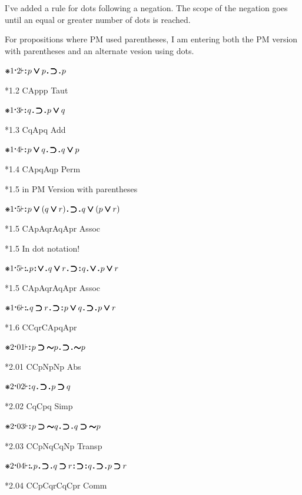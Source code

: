 \documentclass[12pt]{article}
\newcommand{\pmthm}{\mathpunct{\text{\scalebox{.5}[1]{$\boldsymbol\vdash$}}}} %
\newcommand{\pmast}{\text{\resizebox{!}{.75\height}{\ding{107}}}} %
\newcommand{\pmcdot}{\text{\raisebox{.05cm}{$\boldsymbol\cdot$}}} %
\newcommand{\pmiddf}{\mathbin{=}}
\newcommand{\pmd}{\hbox{\rule{.3ex}{.3ex}}} %
\newcommand{\pmdd}{\overset{\pmd}{\pmd}} %
\newcommand{\pmdot}{\mathinner{\pmd}}
\newcommand{\pmdott}{\mathinner{\pmdd}}
\newcommand{\pmdottt}{\mathinner{\pmdd\hspace{1pt}\pmd}}
\newcommand{\pmnot}{\mathord{\ooalign{$\boldsymbol{\sim}\mkern.5mu$\hidewidth\cr$\boldsymbol{\sim}$\cr\hidewidth$\mkern.5mu\boldsymbol{\sim}$}}}
\newcommand{\pmor}{\mathbin{\ooalign{$\boldsymbol{\vee}\mkern.5mu$\hidewidth\cr$\boldsymbol{\vee}$\cr\hidewidth$\mkern.5mu\boldsymbol{\vee}$}}}
\newcommand{\pmimp}{\mathbin{\ooalign{$\boldsymbol{\supset}\mkern.5mu$\hidewidth\cr$\boldsymbol{\supset}$\cr\hidewidth$\mkern.5mu\boldsymbol{\supset}$}}} %
\begin{document}
I've added a rule for dots following a negation. The scope of the negation goes until an equal or greater number of dots is reached.

For propositions where PM used parentheses, I am entering both the PM version with parentheses and an alternate vesion using dots.



$\pmast 1 \pmcdot 2 \pmthm \pmdott p \pmor p \pmdot \pmimp \pmdot p $

*1.2 CAppp Taut

$\pmast 1 \pmcdot 3 \pmthm \pmdott q \pmdot \pmimp \pmdot p \pmor q $

*1.3 CqApq Add

$\pmast 1 \pmcdot 4 \pmthm \pmdott p \pmor q \pmdot \pmimp \pmdot q \pmor p $

*1.4 CApqAqp Perm

*1.5 in PM Version with parentheses

$\pmast 1 \pmcdot 5 \pmthm \pmdott p \pmor ( q \pmor r ) \pmdot \pmimp \pmdot q \pmor ( p \pmor r ) $

*1.5 CApAqrAqApr Assoc

*1.5 In dot notation!

$\pmast 1 \pmcdot 5 \pmthm \pmdottt p \pmdott \pmor \pmdot q \pmor r \pmdot \pmimp \pmdott q \pmdot \pmor \pmdot p \pmor r $

*1.5 CApAqrAqApr Assoc

$\pmast 1 \pmcdot 6 \pmthm \pmdottt q \pmimp r \pmdot \pmimp \pmdott p \pmor q \pmdot \pmimp \pmdot p \pmor r  $

*1.6 CCqrCApqApr

$\pmast 2 \pmcdot 01 \pmthm \pmdott p \pmimp \pmnot p \pmdot \pmimp \pmdot \pmnot p $

*2.01 CCpNpNp Abs

$\pmast 2 \pmcdot 02 \pmthm \pmdott q \pmdot \pmimp \pmdot p \pmimp q $

*2.02 CqCpq Simp

$\pmast 2 \pmcdot 03 \pmthm \pmdott p \pmimp \pmnot q \pmdot \pmimp \pmdot q \pmimp \pmnot p $

*2.03 CCpNqCqNp Transp

$\pmast 2 \pmcdot 04 \pmthm \pmdottt p \pmdot \pmimp \pmdot q \pmimp r \pmdott \pmimp \pmdott q \pmdot \pmimp \pmdot p \pmimp r $

*2.04 CCpCqrCqCpr Comm
\end{document}
